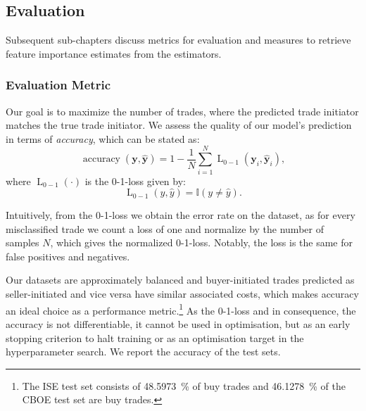 \subsection{Evaluation}\label{sec:evaluation}

Subsequent sub-chapters discuss metrics for evaluation and measures to retrieve feature importance estimates from the estimators.

\subsubsection{Evaluation Metric}\label{sec:evaluation-metric}

Our goal is to maximize the number of trades, where the predicted trade initiator matches the true trade initiator. We assess the quality of our model’s prediction in terms of \emph{accuracy}, which can be stated as:
\begin{equation}
    \operatorname{accuracy}(\mathbf{y}, \widehat{\mathbf{y}}) = 1 - \frac{1}{N}\sum_{i=1}^{N} \operatorname{L}_{\mathrm{0-1}}(\mathbf{y}_i, \widehat{\mathbf{y}}_i),
\end{equation}
where $\operatorname{L}_{\mathrm{0-1}}(\cdot)$ is the 0-1-loss given by:
\begin{equation}
    \operatorname{L}_{\mathrm{0-1}}(y, \hat{y}) = \mathbb{I}\left(y\neq \hat{y}\right).
\end{equation}

Intuitively, from the 0-1-loss we obtain the error rate on the dataset, as for every misclassified trade we count a loss of one and normalize by the number of samples $N$, which gives the normalized 0-1-loss. Notably, the loss is the same for false positives and negatives.

Our datasets are approximately balanced and buyer-initiated trades predicted as seller-initiated and vice versa have similar associated costs, which makes accuracy an ideal choice as a performance metric.\footnote{The \gls{ISE} test set consists of \SI{48.5973}{\percent} of buy trades and \SI{46.1278}{\percent} of the \gls{CBOE} test set are buy trades.} As the 0-1-loss and in consequence, the accuracy is not differentiable, it cannot be used in optimisation, but as an early stopping criterion to halt training or as an optimisation target in the hyperparameter search. We report the accuracy of the test sets.

